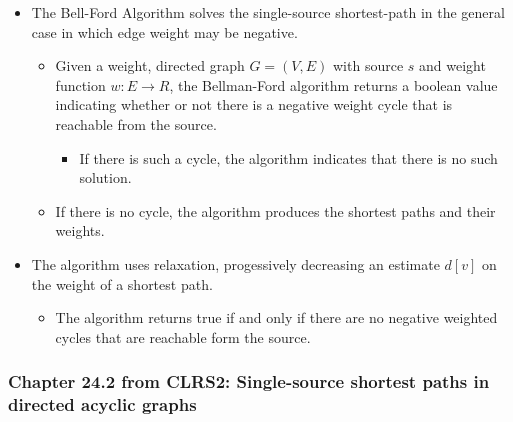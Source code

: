\documentclass[a4paper,11pt]{article}
\begin{document}
\begin{itemize}
\itemsep1pt\parskip0pt
\item
  The Bell-Ford Algorithm solves the single-source shortest-path in the
  general case in which edge weight may be negative.

  \begin{itemize}
  \itemsep1pt\parskip0pt
  \item
    Given a weight, directed graph $G = (V, E)$ with source $s$ and
    weight function $w : E \to R$, the Bellman-Ford algorithm returns a
    boolean value indicating whether or not there is a negative weight
    cycle that is reachable from the source.

    \begin{itemize}
    \itemsep1pt\parskip0pt
    \item
      If there is such a cycle, the algorithm indicates that there is no
      such solution.
    \end{itemize}
  \item
    If there is no cycle, the algorithm produces the shortest paths and
    their weights.
  \end{itemize}
\item
  The algorithm uses relaxation, progessively decreasing an estimate
  $d[v]$ on the weight of a shortest path.

  \begin{itemize}
  \itemsep1pt\parskip0pt
  \item
    The algorithm returns true if and only if there are no negative
    weighted cycles that are reachable form the source.
  \end{itemize}
\end{itemize}

\subsubsection{Chapter 24.2 from CLRS2: Single-source shortest paths in
directed acyclic
graphs}\label{chapter-24.2-from-clrs2-single-source-shortest-paths-in-directed-acyclic-graphs}
\end{document}
